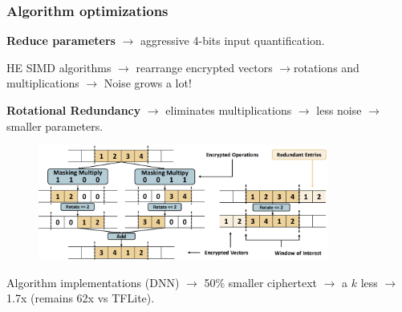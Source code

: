 \documentclass[10pt,handout]{beamer}
\begin{document}
\begin{frame}
\frametitle{Algorithm optimizations}
    \textbf{Reduce parameters}  $\rightarrow$ aggressive 4-bits input quantification.
    \vspace{-0.2cm}

    \pause
 HE SIMD algorithms $\rightarrow$ rearrange encrypted vectors  $\rightarrow$rotations and multiplications  $\rightarrow$ Noise grows a lot!

    \pause
    \vspace{-0.2cm}
    \textbf{Rotational Redundancy} $\rightarrow$ eliminates multiplications $\rightarrow$ less noise $\rightarrow$ smaller parameters.


    \pause
    \vspace{-0.4cm}
\begin{figure}
    \includegraphics[width=0.85\textwidth]{rotation.png}
\end{figure}
    \pause
    \vspace{-0.4cm}
    Algorithm implementations (DNN) $\rightarrow$ 50\% smaller ciphertext $\rightarrow$ a $k$  less $\rightarrow$ 1.7x (remains 62x vs TFLite).

\end{frame}

\end{document}
